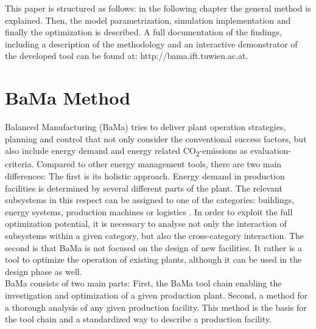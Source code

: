 \documentclass[3p,times,procedia,twocolumn,twoside]{elsarticle}
\begin{document}
This paper is structured as follows: in the following chapter the general method is explained. Then, the model parametrization, simulation implementation and finally the optimization is described. A full documentation of the findings, including a description of the methodology and an interactive demonstrator of the developed tool can be found at: http://bama.ift.tuwien.ac.at.
\section{BaMa Method}
Balanced Manufacturing (BaMa) tries to deliver plant operation strategies, planning and control that not only consider the conventional success factors, but also include energy demand and energy related CO\textsubscript{2}-emissions as evaluation-criteria. Compared to other energy management tools, there are two main differences: The first is its holistic approach. Energy demand in production facilities is determined by several different parts of the plant. The relevant subsystems in this respect can be assigned to one of the categories: buildings, energy systems, production machines or logistics \cite{Leobner2015}. In order to exploit the full optimization potential, it is necessary to analyse not only the interaction of subsystems within a given category, but also the cross-category interaction. The second is that BaMa is not focused on the design of new facilities. It rather is a tool to optimize the operation of existing plants, although it can be used in the design phase as well. \\
BaMa consists of two main parts: First, the BaMa tool chain enabling the investigation and optimization of a given production plant. Second, a method for a thorough analysis of any given production facility. \linebreak This method is the basis for the tool chain and a standardized way to describe a production facility.\\
\end{document}
